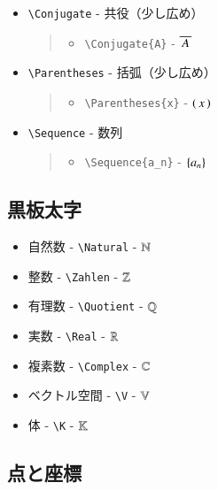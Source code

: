 \documentclass[oneside,10pt,a4paper]{jsarticle}
\begin{document}
\begin{itemize}
\begin{quote}
      \end{quote}
    \item \verb|\Conjugate| - 共役（少し広め）
      \begin{quote}
        \Example
        \begin{itemize}
          \item \verb|\Conjugate{A}| - $\overline{ \, A \, }$
        \end{itemize}
      \end{quote}
    \item \verb|\Parentheses| - 括弧（少し広め）
      \begin{quote}
        \Example
        \begin{itemize}
          \item \verb|\Parentheses{x}| - $\left( \, x \, \right)$
        \end{itemize}
      \end{quote}
    \item \verb|\Sequence| - 数列
      \begin{quote}
        \Example
        \begin{itemize}
          \item \verb|\Sequence{a_n}| - $\left\{ a_n \right\}$
        \end{itemize}
      \end{quote}
  \end{itemize}

  \newpage

  \subsection{黒板太字}

  \begin{itemize}
    \item 自然数 - \verb|\Natural| - $\mathbb{N}$
    \item 整数 - \verb|\Zahlen| - $\mathbb{Z}$
    \item 有理数 - \verb|\Quotient| - $\mathbb{Q}$
    \item 実数 - \verb|\Real| - $\mathbb{R}$
    \item 複素数 - \verb|\Complex| - $\mathbb{C}$
    \item ベクトル空間 - \verb|\V| - $\mathbb{V}$
    \item 体 - \verb|\K| - $\mathbb{K}$
  \end{itemize}

  \subsection{点と座標}
\end{document}
